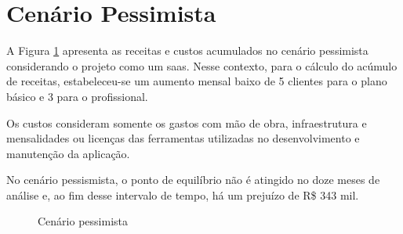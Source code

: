 \section{Cenário Pessimista}

A Figura \ref{fig:cenario-pessimista} apresenta as receitas e custos acumulados no cenário pessimista considerando o projeto como um \gls{saas}. Nesse contexto, para o cálculo do acúmulo de receitas, estabeleceu-se um aumento mensal baixo de 5 clientes para o plano básico e 3 para o profissional.

Os custos consideram somente os gastos com mão de obra, infraestrutura e mensalidades ou licenças das ferramentas utilizadas no desenvolvimento e manutenção da aplicação.

No cenário pessismista, o ponto de equilíbrio não é atingido no doze meses de análise e, ao fim desse intervalo de tempo, há um prejuízo de R\$ 343 mil.
\begin{figure}[h]
	\centering
	\caption{Cenário pessimista}
	\label{fig:cenario-pessimista}
\end{figure}